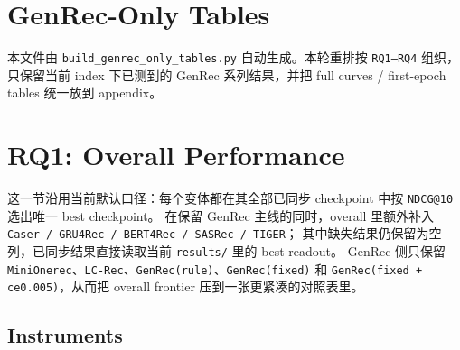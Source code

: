 \documentclass[11pt,a4paper]{ctexart}
\begin{document}
\setcounter{secnumdepth}{3}
\setcounter{tocdepth}{3}

\section{GenRec-Only Tables}

本文件由 \texttt{build\_genrec\_only\_tables.py} 自动生成。本轮重排按 \texttt{RQ1--RQ4} 组织，只保留当前 index 下已测到的 GenRec 系列结果，并把 full curves / first-epoch tables 统一放到 appendix。

\tableofcontents
\newpage

\section{RQ1: Overall Performance}

这一节沿用当前默认口径：每个变体都在其全部已同步 checkpoint 中按 \texttt{NDCG@10} 选出唯一 best checkpoint。 在保留 GenRec 主线的同时，overall 里额外补入 \texttt{Caser / GRU4Rec / BERT4Rec / SASRec / TIGER}； 其中缺失结果仍保留为空列，已同步结果直接读取当前 \texttt{results/} 里的 best readout。 GenRec 侧只保留 \texttt{MiniOnerec}、\texttt{LC-Rec}、\texttt{GenRec(rule)}、\texttt{GenRec(fixed)} 和 \texttt{GenRec(fixed + ce0.005)}，从而把 overall frontier 压到一张更紧凑的对照表里。

\FloatBarrier

\subsection{Instruments}
\end{document}
